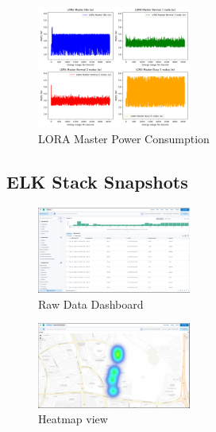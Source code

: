 \begin{figure}[H]
  \begin{center}
    \includegraphics[width=0.45\textwidth]{./Figures/Power_Consumption/LORA_MASTER.png}
  \end{center}
  \caption{LORA Master Power Consumption}\label{fig:loramaster_power_consumption}
\end{figure}

\subsection{ELK Stack Snapshots}

\begin{figure}[H]
  \begin{center}
    \includegraphics[width=0.45\textwidth]{./Figures/elk/raw_data_dashboard.png}
  \end{center}
  \caption{Raw Data Dashboard}\label{fig:raw_data_dashboard}
\end{figure}

\begin{figure}[H]
  \begin{center}
    \includegraphics[width=0.45\textwidth]{./Figures/elk/heatmap.png}
  \end{center}
  \caption{Heatmap view}\label{fig:heatmap}
\end{figure}